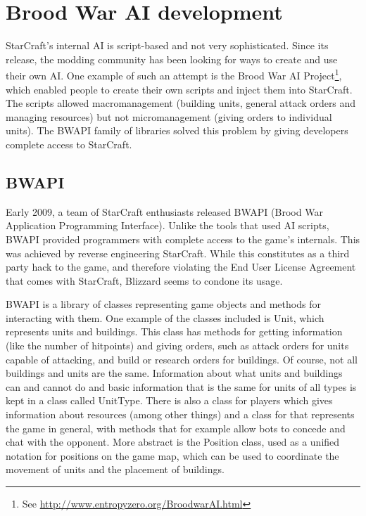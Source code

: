 
\chapter{Brood War AI development}
\label{chap:libraries}

StarCraft's internal AI is script-based and not very sophisticated. Since its release, the modding community has been looking for ways to create and use their own AI. One example of such an attempt is the Brood War AI Project\footnote{See \url{http://www.entropyzero.org/BroodwarAI.html}}, which enabled people to create their own scripts and inject them into StarCraft. The scripts allowed macromanagement (building units, general attack orders and managing resources) but not micromanagement (giving orders to individual units). The BWAPI family of libraries solved this problem by giving developers complete access to StarCraft.

\section{BWAPI}

Early 2009, a team of StarCraft enthusiasts released BWAPI (Brood War Application Programming Interface). Unlike the tools that used AI scripts, BWAPI provided programmers with complete access to the game's internals. This was achieved by reverse engineering StarCraft. While this constitutes as a third party hack to the game, and therefore violating the End User License Agreement that comes with StarCraft, Blizzard seems to condone its usage.

BWAPI is a library of classes representing game objects and methods for interacting with them. One example of the classes included is Unit, which represents units and buildings. This class has methods for getting information (like the number of hitpoints) and giving orders, such as attack orders for units capable of attacking, and build or research orders for buildings. Of course, not all buildings and units are the same. Information about what units and buildings can and cannot do and basic information that is the same for units of all types is kept in a class called UnitType. There is also a class for players which gives information about resources (among other things) and a class for that represents the game in general, with methods that for example allow bots to concede and chat with the opponent. More abstract is the Position class, used as a unified notation for positions on the game map, which can be used to coordinate the movement of units and the placement of buildings.

